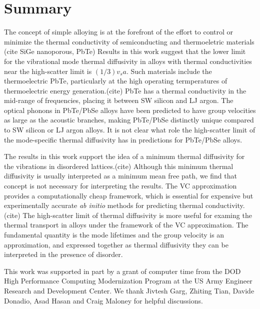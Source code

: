 \documentclass[aps,prb,twocolumn,superscriptaddress,amsmath,amssymb,floatfix]{revtex4}
\begin{document}
\section{\label{S:Summary}Summary}

The concept of simple alloying is at the forefront of the effort 
to control or minimize the thermal conductivity of semiconducting and 
thermoeletric materials (cite SiGe nanoporous, PbTe) 
Results in this work suggest that the lower limit for the vibrational 
mode thermal diffusivity in alloys with thermal conductivities near the 
high-scatter limit is $(1/3)v_sa$. 
Such materials include the thermoelectric PbTe,
particularly at the high operating termperatures of thermoelectric 
energy generation.(cite) PbTe has a thermal conductivity in the 
mid-range of frequencies, placing it between SW silicon and 
LJ argon. The optical phonons in PbTe/PbSe alloys have been 
predicted to have group velocities 
as large as the acoustic branches, 
making PbTe/PbSe distinctly unique compared 
to SW silicon or LJ argon alloys.
\cite{tian_phonon_2012} 
It is not clear what role the high-scatter limit of the mode-specific 
thermal diffusivity has in predictions for PbTe/PbSe alloys. 

The results in this work support the idea of a minimum thermal diffusivity 
for the vibrations in disordered lattices.(cite) 
Although this minimum thermal 
diffusivity is usually interpreted as a minimum mean free path, we find 
that concept is not necessary for interpreting the results. The VC 
approximation provides a computationally cheap framework, which is 
essential for expensive but experimentally accurate \emph{ab initio} 
methods for predicting thermal conductivity.(cite) 
The high-scatter limit 
of thermal diffusivity is more useful for examing the thermal transport 
in alloys under the framework of the VC approximation. The 
fundamental quantity is the mode lifetimes and the group velocity 
is an approximation, and expressed together as thermal diffusivity 
they can be interpreted in the presence of disorder.

\begin{acknowledgements}
This work was supported in part by a grant of computer time from the DOD 
High Performance Computing Modernization Program at the US Army Engineer 
Research and Development Center. 
We thank Jivtesh Garg, Zhiting Tian, Davide Donadio, 
Asad Hasan and Craig Maloney for helpful discussions.
\end{acknowledgements}
\end{document}
